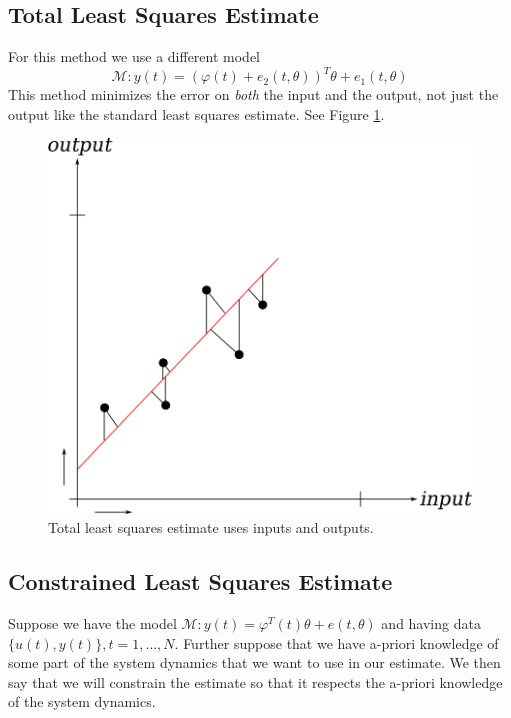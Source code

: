 \documentclass[lecture,12pt,]{pcms-l}
\begin{document}
\subsection{Total Least Squares Estimate}
For this method we use a different model
$$\mathcal{M}: y(t) = (\varphi(t)+e_2(t,\theta))^T\theta+e_1(t,\theta)$$
This method minimizes the error on \textit{both} the input and the output, not just the output like the standard least squares estimate. See Figure \ref{fig:09totalLS}.

\begin{figure}[ht!]
  \centering
  \includegraphics[width=.3\textwidth]{images/09totalLS}
  \caption{Total least squares estimate uses inputs and outputs.}
  \label{fig:09totalLS}
\end{figure}

\subsection{Constrained Least Squares Estimate}
Suppose we have the model $\mathcal{M}: y(t) = \varphi^T(t)\theta + e(t,\theta)$ and having data $\{u(t),y(t)\}, t=1,\ldots,N$. Further suppose that we have a-priori knowledge of some part of the system dynamics that we want to use in our estimate. We then say that we will constrain the estimate so that it respects the a-priori knowledge of the system dynamics.
\end{document}
